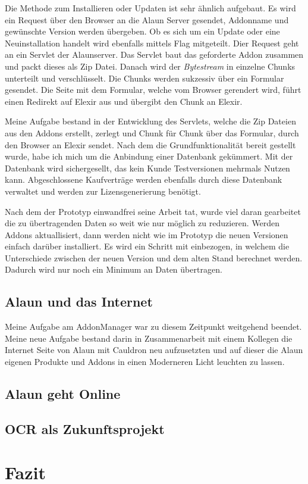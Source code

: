 \documentclass[12pt]{article}
\begin{document}
Die Methode zum Installieren oder Updaten ist sehr ähnlich aufgebaut. Es wird ein Request über den Browser an die Alaun Server gesendet, Addonname
und gewünschte Version werden übergeben. Ob es sich um ein Update oder eine Neuinstallation handelt wird ebenfalls mittels Flag mitgeteilt.
Dier Request geht an ein Servlet der Alaunserver. Das Servlet baut das geforderte Addon zusammen und packt dieses als Zip Datei. Danach wird
der \textit{Bytestream} in einzelne Chunks unterteilt und verschlüsselt. Die Chunks werden sukzessiv über ein Formular gesendet. Die Seite mit dem 
Formular, welche vom Browser gerendert wird, führt einen Redirekt auf Elexir aus und übergibt den Chunk an Elexir.

Meine Aufgabe bestand in der Entwicklung des Servlets, welche die Zip Dateien aus den Addons erstellt, zerlegt und Chunk für Chunk über das Formular,
durch den Browser an Elexir sendet.
Nach dem die Grundfunktionalität bereit gestellt wurde, habe ich mich um die Anbindung einer Datenbank gekümmert. Mit der Datenbank wird sichergesellt,
das kein Kunde Testversionen mehrmals Nutzen kann. Abgeschlossene Kaufverträge werden ebenfalls durch diese Datenbank verwaltet und werden zur
Lizensgenerierung benötigt.

Nach dem der Prototyp einwandfrei seine Arbeit tat, wurde viel daran gearbeitet die zu übertragenden Daten so weit wie nur möglich zu reduzieren.
Werden Addons aktuallisiert, dann werden nicht wie im Prototyp die neuen Versionen einfach darüber installiert. Es wird ein Schritt mit einbezogen,
in welchem die Unterschiede zwischen der neuen Version und dem alten Stand berechnet werden. Dadurch wird nur noch ein Minimum an Daten übertragen.

\subsection{Alaun und das Internet}

Meine Aufgabe am AddonManager war zu diesem Zeitpunkt weitgehend beendet. Meine neue Aufgabe bestand darin in Zusammenarbeit mit einem Kollegen
die Internet Seite von Alaun mit Cauldron neu aufzusetzten und auf dieser die Alaun eigenen Produkte und Addons in einen Moderneren Licht leuchten
zu lassen.

\subsection{Alaun geht Online}

\subsection{OCR als Zukunftsprojekt}

\section{Fazit}
\end{document}
